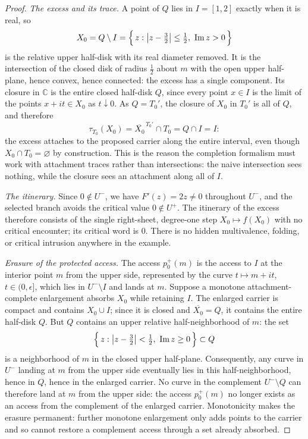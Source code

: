 \documentclass[11pt,reqno]{amsart}
\theoremstyle{definition}
\theoremstyle{remark}
\newcommand{\C}{\mathbb C}
\begin{document}
\begin{proof}
\emph{The excess and its trace.}
A point of $Q$ lies in $I=[1,2]$ exactly when it is real, so
\[
X_0=Q\setminus I
=\Bigl\{\,z:\bigl|z-\tfrac32\bigr|\le\tfrac12,\ \operatorname{Im}z>0\,\Bigr\}
\]
is the relative upper half-disk with its real diameter removed. It is the
intersection of the closed disk of radius $\tfrac12$ about $m$ with the open
upper half-plane, hence convex, hence connected: the excess has a single
component. Its closure in $\C$ is the entire closed half-disk
$Q$, since every point $x\in I$ is the limit of the points $x+it\in X_0$ as
$t\downarrow 0$. As $Q=T_0'$, the closure of $X_0$ in $T_0'$ is all of $Q$,
and therefore
\[
\tau_{T_0}(X_0)=\overline{X_0}^{\,T_0'}\cap T_0=Q\cap I=I:
\]
the excess attaches to the proposed carrier along the entire interval, even
though $X_0\cap T_0=\varnothing$ by construction. This is the reason the
completion formalism must work with attachment traces rather than
intersections: the naive intersection sees nothing, while the closure sees an
attachment along all of $I$.

\emph{The itinerary.}
Since $0\notin U^{-}$, we have $F'(z)=2z\ne 0$ throughout $U^{-}$, and the
selected branch avoids the critical value $0\notin U^{+}$. The itinerary of
the excess therefore consists of the single right-sheet, degree-one step
$X_0\mapsto f(X_0)$ with no critical encounter; its critical word is $0$.
There is no hidden multivalence, folding, or critical intrusion anywhere in
the example.

\emph{Erasure of the protected access.}
The access $p_0^{+}(m)$ is the access to $I$ at the interior point $m$ from
the upper side, represented by the curve $t\mapsto m+it$, $t\in(0,\epsilon]$,
which lies in $U^{-}\setminus I$ and lands at $m$. Suppose a monotone
attachment-complete enlargement absorbs $X_0$ while retaining $I$. The
enlarged carrier is compact and contains $X_0\cup I$; since it is closed and
$\overline{X_0}=Q$, it contains the entire half-disk $Q$. But $Q$ contains an
upper relative half-neighborhood of $m$: the set
\[
\Bigl\{\,z:\bigl|z-\tfrac32\bigr|<\tfrac12,\ \operatorname{Im}z\ge 0\,\Bigr\}
\subset Q
\]
is a neighborhood of $m$ in the closed upper half-plane. Consequently, any
curve in $U^{-}$ landing at $m$ from the upper side eventually lies in this
half-neighborhood, hence in $Q$, hence in the enlarged carrier. No curve in
the complement $U^{-}\setminus Q$ can therefore land at $m$ from the upper
side: the access $p_0^{+}(m)$ no longer exists as an access from the
complement of the enlarged carrier. Monotonicity makes the erasure permanent:
further monotone enlargement only adds points to the carrier and so cannot
restore a complement access through a set already absorbed.


\end{proof}
\end{document}
